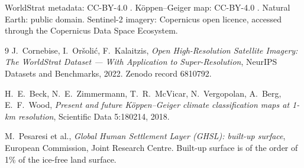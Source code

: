 \documentclass[11pt,a4paper]{article}
\begin{document}
WorldStrat metadata: CC-BY-4.0 \cite{worldstrat}. Köppen--Geiger map: CC-BY-4.0 \cite{koppen}.
Natural Earth: public domain. Sentinel-2 imagery: Copernicus open licence, accessed through the
Copernicus Data Space Ecosystem.

\begin{thebibliography}{9}
J.~Cornebise, I.~Oršolić, F.~Kalaitzis,
\emph{Open High-Resolution Satellite Imagery: The WorldStrat Dataset --- With Application to
Super-Resolution},
NeurIPS Datasets and Benchmarks, 2022. Zenodo record 6810792.

H.~E.~Beck, N.~E.~Zimmermann, T.~R.~McVicar, N.~Vergopolan, A.~Berg, E.~F.~Wood,
\emph{Present and future Köppen--Geiger climate classification maps at 1-km resolution},
Scientific Data 5:180214, 2018.

M.~Pesaresi et al.,
\emph{Global Human Settlement Layer (GHSL): built-up surface},
European Commission, Joint Research Centre. Built-up surface is of the order of 1\% of the
ice-free land surface.
\end{thebibliography}
\end{document}
